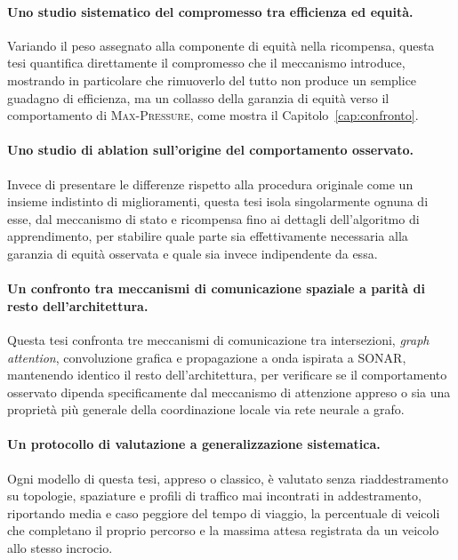 \paragraph{Uno studio sistematico del compromesso tra efficienza ed
equità.} Variando il peso assegnato alla componente di equità nella
ricompensa, questa tesi quantifica direttamente il compromesso che il
meccanismo introduce, mostrando in particolare che rimuoverlo del tutto
non produce un semplice guadagno di efficienza, ma un collasso della
garanzia di equità verso il comportamento di \textsc{Max-Pressure}, come
mostra il Capitolo~\ref{cap:confronto}.

\paragraph{Uno studio di ablation sull'origine del comportamento
osservato.} Invece di presentare le differenze rispetto alla procedura
originale come un insieme indistinto di miglioramenti, questa tesi isola
singolarmente ognuna di esse, dal meccanismo di stato e ricompensa fino ai
dettagli dell'algoritmo di apprendimento, per stabilire quale parte sia
effettivamente necessaria alla garanzia di equità osservata e quale
sia invece indipendente da essa.

\paragraph{Un confronto tra meccanismi di comunicazione spaziale a parità
di resto dell'architettura.} Questa tesi confronta tre meccanismi di
comunicazione tra intersezioni, \emph{graph attention}, convoluzione
grafica e propagazione a onda ispirata a SONAR, mantenendo identico il
resto dell'architettura, per verificare se il comportamento osservato
dipenda specificamente dal meccanismo di attenzione appreso o sia una
proprietà più generale della coordinazione locale via rete neurale a
grafo.

\paragraph{Un protocollo di valutazione a generalizzazione sistematica.}
Ogni modello di questa tesi, appreso o classico, è valutato senza
riaddestramento su topologie, spaziature e profili di traffico mai
incontrati in addestramento, riportando media e caso peggiore del tempo
di viaggio, la percentuale di veicoli che completano il proprio percorso
e la massima attesa registrata da un veicolo allo stesso incrocio.

